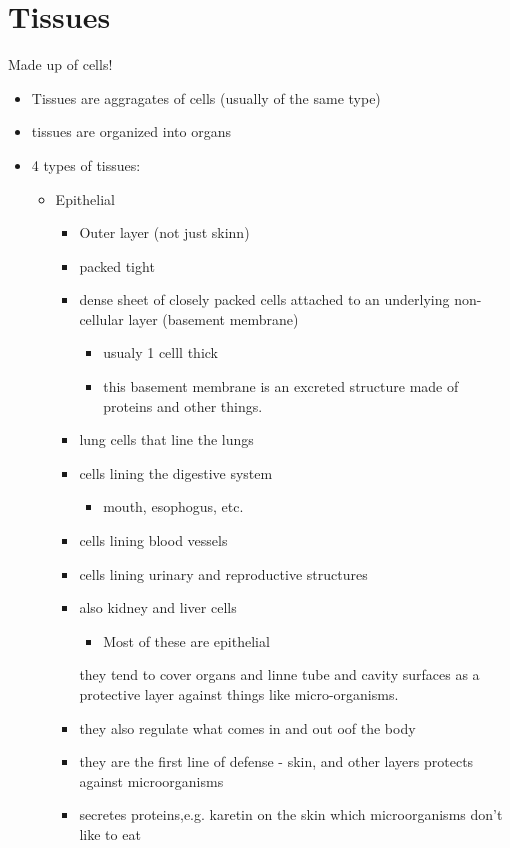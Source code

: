 \documentclass{article}
\theoremstyle{definition}
\begin{document}
\section{Tissues}
Made up of cells!
\begin{itemize}
	\item Tissues are aggragates of cells (usually of the same type)
	\item tissues are organized into organs
	\item 4 types of tissues:
		\begin{itemize}
			\item Epithelial
				\begin{itemize}
					\item Outer layer (not just skinn)
					\item packed tight
					\item dense sheet of closely packed cells attached to an underlying non-cellular layer (basement membrane)
						\begin{itemize}
							\item usualy 1 celll thick
							\item this basement membrane is an excreted structure made of proteins and other things.
						\end{itemize}
					\item lung cells that line the lungs
					\item cells lining the digestive system
						\begin{itemize}
							\item mouth, esophogus, etc.
						\end{itemize}
					\item cells lining blood vessels
					\item cells lining urinary and reproductive structures
					\item also kidney and liver cells
						\begin{itemize}
							\item Most of these are epithelial
						\end{itemize}
					\iteme they tend to cover organs and linne tube and cavity surfaces as a protective layer against things like micro-organisms.
					\item they also regulate what comes in and out oof the body
					\item they are the first line of defense - skin, and other layers protects against microorganisms
					\item secretes proteins,e.g. karetin on the skin which microorganisms don't like to eat

\end{itemize}
\end{itemize}
\end{itemize}
\end{document}
